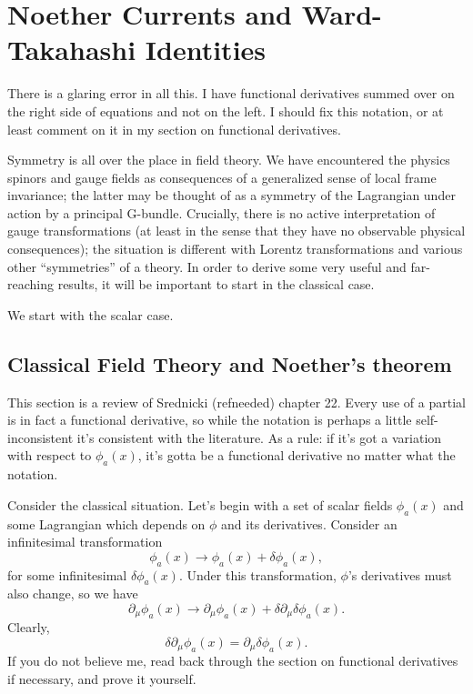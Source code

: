 \documentclass[main.tex]{subfiles}
\begin{document}
\chapter{Noether Currents and Ward-Takahashi Identities}

There is a glaring error in all this. I have functional derivatives summed over on the right side of equations and not on the left. I should fix this notation, or at least comment on it in my section on functional derivatives.


Symmetry is all over the place in field theory. We have encountered the physics spinors and gauge fields as consequences of a generalized sense of local frame invariance; the latter may be thought of as a symmetry of the Lagrangian under action by a principal G-bundle. Crucially, there is no active interpretation of gauge transformations (at least in the sense that they have no observable physical consequences); the situation is different with Lorentz transformations and various other ``symmetries'' of a theory. In order to derive some very useful and far-reaching results, it will be important to start in the classical case.

We start with the scalar case.
\section{Classical Field Theory and Noether's theorem}
This section is a review of Srednicki (refneeded) chapter 22.  Every use of a partial is in fact a functional derivative, so while the notation is perhaps a little self-inconsistent it's consistent with the literature. As a rule: if it's got a variation with respect to $\phi_a (x)$, it's gotta be a functional derivative no matter what the notation.

Consider the classical situation. Let's begin with a set of scalar fields $\phi_a(x)$ and some Lagrangian which depends on $\phi$ and its derivatives. Consider an infinitesimal transformation
\begin{equation} \label{varphi}
\phi_a (x) \to \phi_a(x) + \delta \phi_a (x),
\end{equation}
for some infinitesimal $\delta \phi_a(x)$. Under this transformation, $\phi$'s derivatives must also change, so we have
\[
\partial_\mu \phi_a(x) \to \partial_\mu \phi_a(x) + \delta \partial_\mu \delta \phi_a (x).
\]
Clearly,
\[
\delta \partial_\mu \phi_a (x)=\partial_\mu \delta \phi_a (x).
\]
If you do not believe me, read back through the section on functional derivatives if necessary, and prove it yourself. 
\end{document}
